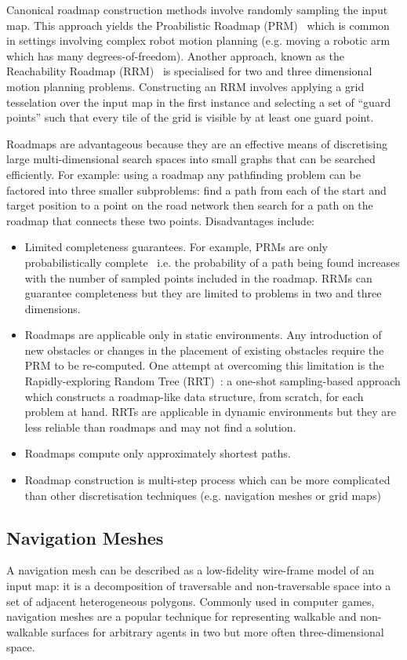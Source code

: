 Canonical roadmap construction methods involve randomly sampling the input map.
This approach yields the Proabilistic Roadmap (PRM)~\citep{kavraki94} which is
common in settings involving complex robot motion planning (e.g. moving a
robotic arm which has many degrees-of-freedom).  Another approach, known as the
Reachability Roadmap (RRM)~\citep{geraerts05} is specialised for two and three
dimensional motion planning problems.  Constructing an RRM involves applying a
grid tesselation over the input map in the first instance and selecting a set of
``guard points'' such that every tile of the grid is visible by at least one
guard point.

Roadmaps are advantageous because they are an effective means of discretising
large multi-dimensional search spaces into small graphs that can be searched
efficiently. For example: using a roadmap any pathfinding problem can be
factored into three smaller subproblems: find a path from each of the start and
target position to a point on the road network then search for a path on the
roadmap that connects these two points. Disadvantages include:
\begin{itemize}
\item{Limited completeness guarantees. For example, PRMs are only 
probabilistically complete~\citep{barraquand97} i.e. the probability 
of a path being found increases with the number of sampled points included in the 
roadmap.
RRMs can guarantee completeness but they are limited to problems in two and three 
dimensions.}
\item{Roadmaps are applicable only in static environments. Any introduction of
new obstacles or changes in the placement of existing obstacles require the PRM
to be re-computed. One attempt at overcoming this limitation is the
Rapidly-exploring Random Tree (RRT)~\citep{lavalle98}: a one-shot sampling-based
approach which constructs a roadmap-like data structure, from scratch, for each
problem at hand.  RRTs are applicable in dynamic environments but they are less
reliable than roadmaps and may not find a solution.}
\item{Roadmaps compute only approximately shortest paths.}
\item{Roadmap construction is multi-step process which can be more complicated than 
other discretisation techniques (e.g. navigation meshes or grid maps)}
\end{itemize}

\subsection{Navigation Meshes}
\label{cha::lit::graphs::nav}
A navigation mesh can be described as a low-fidelity wire-frame model of an 
input map: it is a decomposition of traversable and non-traversable space into 
a set of adjacent heterogeneous polygons. Commonly used in computer games, 
navigation meshes are a popular technique for representing walkable and
non-walkable surfaces for arbitrary agents in two but more often 
three-dimensional space.

